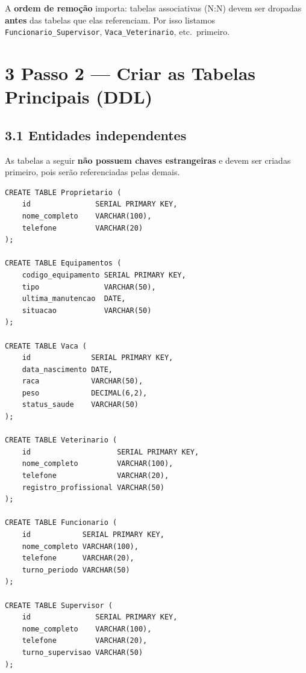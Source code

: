 \documentclass[12pt]{article}
\begin{document}
\begin{dica}
A \textbf{ordem de remoção} importa: tabelas associativas (N:N) devem ser
dropadas \textbf{antes} das tabelas que elas referenciam. Por isso listamos
\texttt{Funcionario\_Supervisor}, \texttt{Vaca\_Veterinario}, etc.\ primeiro.
\end{dica}

\vspace{0.5cm}

\section*{3 \enspace Passo 2 — Criar as Tabelas Principais (DDL)}

\subsection*{3.1 \enspace Entidades independentes}

As tabelas a seguir \textbf{não possuem chaves estrangeiras} e devem ser criadas
primeiro, pois serão referenciadas pelas demais.

\begin{lstlisting}[caption={Proprietário, Equipamentos, Vaca, Veterinário, Funcionário, Supervisor}]
CREATE TABLE Proprietario (
    id               SERIAL PRIMARY KEY,
    nome_completo    VARCHAR(100),
    telefone         VARCHAR(20)
);

CREATE TABLE Equipamentos (
    codigo_equipamento SERIAL PRIMARY KEY,
    tipo               VARCHAR(50),
    ultima_manutencao  DATE,
    situacao           VARCHAR(50)
);

CREATE TABLE Vaca (
    id              SERIAL PRIMARY KEY,
    data_nascimento DATE,
    raca            VARCHAR(50),
    peso            DECIMAL(6,2),
    status_saude    VARCHAR(50)
);

CREATE TABLE Veterinario (
    id                    SERIAL PRIMARY KEY,
    nome_completo         VARCHAR(100),
    telefone              VARCHAR(20),
    registro_profissional VARCHAR(50)
);

CREATE TABLE Funcionario (
    id            SERIAL PRIMARY KEY,
    nome_completo VARCHAR(100),
    telefone      VARCHAR(20),
    turno_periodo VARCHAR(50)
);

CREATE TABLE Supervisor (
    id               SERIAL PRIMARY KEY,
    nome_completo    VARCHAR(100),
    telefone         VARCHAR(20),
    turno_supervisao VARCHAR(50)
);
\end{lstlisting}
\end{document}
